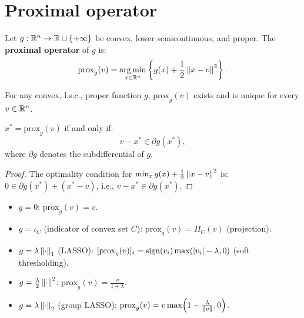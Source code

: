\section{Proximal operator}

\begin{definition}
Let $g : \mathbb{R}^n \to \mathbb{R} \cup \{+\infty\}$ be convex, lower semicontinuous, and
proper. The \textbf{proximal operator} of $g$ is:
\[
  \mathrm{prox}_g(v) = \operatorname*{arg\,min}_{x \in \mathbb{R}^n} \left\{
    g(x) + \frac{1}{2} \left\| x - v \right\|^2
  \right\}.
\]
\end{definition}

\begin{proposition}
For any convex, l.s.c., proper function $g$, $\mathrm{prox}_g(v)$ exists and
is unique for every $v \in \mathbb{R}^n$.
\end{proposition}

\begin{theorem}[Characterization]
$x^* = \mathrm{prox}_g(v)$ if and only if:
\[
  v - x^* \in \partial g(x^*),
\]
where $\partial g$ denotes the subdifferential of $g$.
\end{theorem}

\begin{proof}
The optimality condition for $\min_x g(x) + \frac{1}{2}\left\| x-v \right\|^2$ is:
$0 \in \partial g(x^*) + (x^* - v)$, i.e., $v - x^* \in \partial g(x^*)$.
\end{proof}

\begin{keyformulas}[title=\textbf{Common proximal operators}]
\begin{itemize}
  \item $g = 0$: $\mathrm{prox}_g(v) = v$.
  \item $g = \iota_C$ (indicator of convex set $C$):
        $\mathrm{prox}_g(v) = \Pi_C(v)$ (projection).
  \item $g = \lambda \left\| \cdot \right\|_1$ (LASSO):
        $[\mathrm{prox}_g(v)]_i = \mathrm{sign}(v_i)
        \max(\left| v_i \right| - \lambda, 0)$ (soft thresholding).
  \item $g = \frac{\lambda}{2}\left\| \cdot \right\|^2$:
        $\mathrm{prox}_g(v) = \frac{v}{1 + \lambda}$.
  \item $g = \lambda \left\| \cdot \right\|_2$ (group LASSO):
        $\mathrm{prox}_g(v) = v \max\!\left(1 - \frac{\lambda}{\left\| v \right\|},
        0\right)$.
\end{itemize}
\end{keyformulas}

